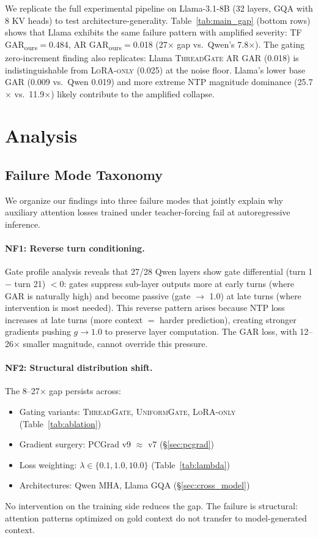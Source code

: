 \documentclass[11pt]{article}
\newcommand{\gar}{\textsc{GAR}}
\newcommand{\garours}{\textsc{GAR}\textsubscript{ours}}
\newcommand{\tg}{\textsc{ThreadGate}}
\newcommand{\ug}{\textsc{UniformGate}}
\newcommand{\lo}{\textsc{LoRA-only}}
\begin{document}
We replicate the full experimental pipeline on Llama-3.1-8B (32 layers, GQA with 8 KV heads) to test architecture-generality. Table~\ref{tab:main_gap} (bottom rows) shows that Llama exhibits the same failure pattern with amplified severity: TF \garours{}$=$0.484, AR \garours{}$=$0.018 (27$\times$ gap vs.\ Qwen's 7.8$\times$). The gating zero-increment finding also replicates: Llama \tg{} AR \gar{} (0.018) is indistinguishable from \lo{} (0.025) at the noise floor. Llama's lower base \gar{} (0.009 vs.\ Qwen 0.019) and more extreme NTP magnitude dominance (25.7$\times$ vs.\ 11.9$\times$) likely contribute to the amplified collapse.

\section{Analysis}

\subsection{Failure Mode Taxonomy}

We organize our findings into three failure modes that jointly explain why auxiliary attention losses trained under teacher-forcing fail at autoregressive inference.

\paragraph{NF1: Reverse turn conditioning.} Gate profile analysis reveals that 27/28 Qwen layers show gate differential (turn 1 $-$ turn 21) $< 0$: gates suppress sub-layer outputs more at early turns (where \gar{} is naturally high) and become passive (gate $\to$ 1.0) at late turns (where intervention is most needed). This reverse pattern arises because NTP loss increases at late turns (more context $=$ harder prediction), creating stronger gradients pushing $g \to 1.0$ to preserve layer computation. The \gar{} loss, with 12--26$\times$ smaller magnitude, cannot override this pressure.

\paragraph{NF2: Structural distribution shift.} The 8--27$\times$ gap persists across:
\begin{itemize}
    \item Gating variants: \tg{}, \ug{}, \lo{} (Table~\ref{tab:ablation})
    \item Gradient surgery: PCGrad v9 $\approx$ v7 (\S\ref{sec:pcgrad})
    \item Loss weighting: $\lambda \in \{0.1, 1.0, 10.0\}$ (Table~\ref{tab:lambda})
    \item Architectures: Qwen MHA, Llama GQA (\S\ref{sec:cross_model})
\end{itemize}
No intervention on the training side reduces the gap. The failure is structural: attention patterns optimized on gold context do not transfer to model-generated context.
\end{document}
